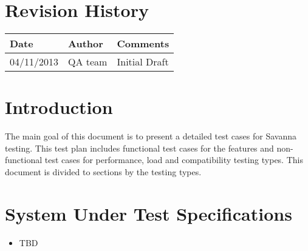\documentclass[a4paper,11pt]{article}
\begin{document}
\thispagestyle{empty}

\clearpage

\pagestyle{fancy}
\thispagestyle{fancy}

\tableofcontents

\newpage

\section{Revision History}


\begin{tabular}{|l|p{4cm}|p{10cm}|}
\hline
{\bf Date} & {\bf Author} & {\bf Comments} \\ 
\hline
04/11/2013 & QA team & Initial Draft \\ 
\hline
\end{tabular}

\section{Introduction}

The main goal of this document is to present a detailed test cases for Savanna testing. This test plan includes functional test cases for the features and non-functional test cases for performance, load and compatibility testing types. This document is divided to sections by the testing types. 


\section{System Under Test Specifications}
\begin{itemize}
\item TBD
\end{itemize}
\end{document}
